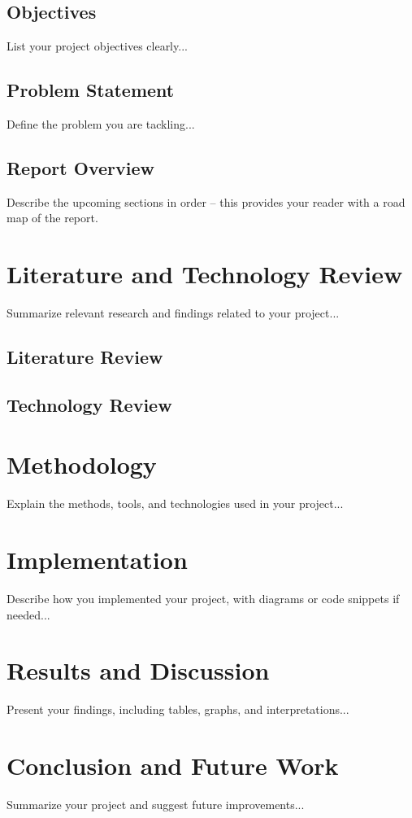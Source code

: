 \documentclass[a4paper,12pt]{report}
\begin{document}
\section{Objectives}
List your project objectives clearly...

\section{Problem Statement}
Define the problem you are tackling...

\section{Report Overview}
Describe the upcoming sections in order -- this provides your reader with a road map of the report.

\chapter{Literature and Technology Review}
Summarize relevant research and findings related to your project...

\section{Literature Review}

\section{Technology Review}

\chapter{Methodology}
Explain the methods, tools, and technologies used in your project...

\chapter{Implementation}
Describe how you implemented your project, with diagrams or code snippets if needed...

\chapter{Results and Discussion}
Present your findings, including tables, graphs, and interpretations...

\chapter{Conclusion and Future Work}
Summarize your project and suggest future improvements...

\newpage



\end{document}
